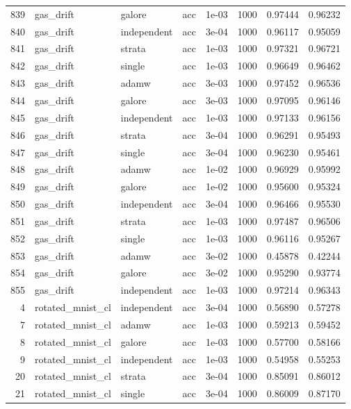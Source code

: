 \begin{longtable}{rlllrrrr}
839 & gas\_drift & galore & acc & 1e-03 & 1000 & 0.97444 & 0.96232 \\
840 & gas\_drift & independent & acc & 3e-04 & 1000 & 0.96117 & 0.95059 \\
\rowcolor{oursbg}
841 & gas\_drift & strata & acc & 1e-03 & 1000 & 0.97321 & 0.96721 \\
842 & gas\_drift & single & acc & 1e-03 & 1000 & 0.96649 & 0.96462 \\
843 & gas\_drift & adamw & acc & 3e-03 & 1000 & 0.97452 & 0.96536 \\
844 & gas\_drift & galore & acc & 3e-03 & 1000 & 0.97095 & 0.96146 \\
845 & gas\_drift & independent & acc & 1e-03 & 1000 & 0.97133 & 0.96156 \\
\rowcolor{oursbg}
846 & gas\_drift & strata & acc & 3e-04 & 1000 & 0.96291 & 0.95493 \\
847 & gas\_drift & single & acc & 3e-04 & 1000 & 0.96230 & 0.95461 \\
848 & gas\_drift & adamw & acc & 1e-02 & 1000 & 0.96929 & 0.95992 \\
849 & gas\_drift & galore & acc & 1e-02 & 1000 & 0.95600 & 0.95324 \\
850 & gas\_drift & independent & acc & 3e-04 & 1000 & 0.96466 & 0.95530 \\
\rowcolor{oursbg}
851 & gas\_drift & strata & acc & 1e-03 & 1000 & 0.97487 & 0.96506 \\
852 & gas\_drift & single & acc & 1e-03 & 1000 & 0.96116 & 0.95267 \\
853 & gas\_drift & adamw & acc & 3e-02 & 1000 & 0.45878 & 0.42244 \\
854 & gas\_drift & galore & acc & 3e-02 & 1000 & 0.95290 & 0.93774 \\
855 & gas\_drift & independent & acc & 1e-03 & 1000 & 0.97214 & 0.96343 \\
4 & rotated\_mnist\_cl & independent & acc & 3e-04 & 1000 & 0.56890 & 0.57278 \\
7 & rotated\_mnist\_cl & adamw & acc & 1e-03 & 1000 & 0.59213 & 0.59452 \\
8 & rotated\_mnist\_cl & galore & acc & 1e-03 & 1000 & 0.57700 & 0.58166 \\
9 & rotated\_mnist\_cl & independent & acc & 1e-03 & 1000 & 0.54958 & 0.55253 \\
\rowcolor{oursbg}
20 & rotated\_mnist\_cl & strata & acc & 3e-04 & 1000 & 0.85091 & 0.86012 \\
21 & rotated\_mnist\_cl & single & acc & 3e-04 & 1000 & 0.86009 & 0.87170 \\

\end{longtable}
